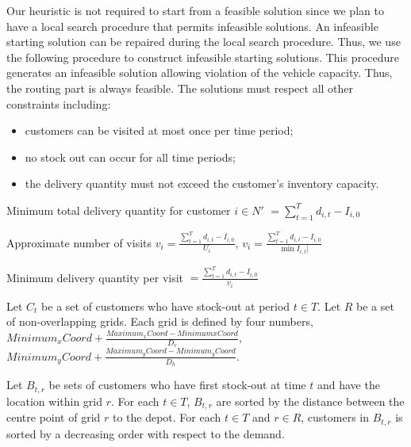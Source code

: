 \documentclass{article}
\begin{document}
Our heuristic is not required to start from a feasible solution since we plan to have a local search procedure that permits infeasible solutions. An infeasible starting solution can be repaired during the local search procedure. Thus, we use the following procedure to construct infeasible starting solutions. This procedure generates an infeasible solution allowing violation of the vehicle capacity. Thus, the routing part is always feasible. The solutions must respect all other constraints including:
\begin{itemize}
    \item customers can be visited at most once per time period;
    \item no stock out can occur for all time periods;
    \item the delivery quantity must not exceed the customer's inventory capacity.
\end{itemize}



Minimum total delivery quantity for customer $i\in N'$ $= \sum^{T}_{t=1}d_{i,t}-I_{i,0}$

Approximate number of visits $v_i= \frac{\sum^T_{t=1}d_{i,t}-I_{i,0}}{U_i}$, $v_i= \frac{\sum^T_{t=1}d_{i,t}-I_{i,0}}{\min{I_{i,t}|}}$

Minimum delivery quantity per visit $=\frac{\sum^T_{t=1}d_{i,t}-I_{i,0}}{v_i}$





Let $C_t$ be a set of customers who have stock-out at period $t\in T$. Let $R$ be a set of non-overlapping grids. Each grid is defined by four numbers, $Minimum_xCoord + \frac{Maximum_xCoord-MinimumxCoord}{D_v}$, $Minimum_yCoord +\frac{Maximum_yCoord-Minimum_yCoord}{D_h}$.


Let $B_{t,r}$ be sets of customers who have first stock-out at time $t$ and have the location within grid $r$. For each $t\in T$, $B_{t,r}$ are sorted by the distance between the centre point of grid $r$ to the depot. For each $t\in T$ and $r\in R$, customers in $B_{t,r}$ is sorted by a decreasing order with respect to the demand.
\end{document}
